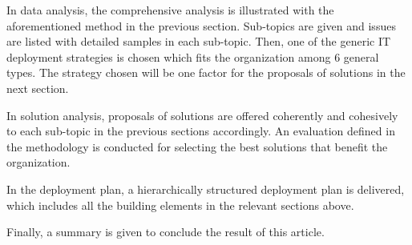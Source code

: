 In data analysis, the comprehensive analysis is illustrated with the aforementioned method in the previous section. Sub-topics are given and issues are listed with detailed samples in each sub-topic. Then, one of the generic IT deployment strategies is chosen which fits the organization among 6 general types. The strategy chosen will be one factor for the proposals of solutions in the next section.

In solution analysis, proposals of solutions are offered coherently and cohesively to each sub-topic in the previous sections accordingly. An evaluation defined in the methodology is conducted for selecting the best solutions that benefit the organization.

In the deployment plan, a hierarchically structured deployment plan is delivered, which includes all the building elements in the relevant sections above.

Finally, a summary is given to conclude the result of this article.



